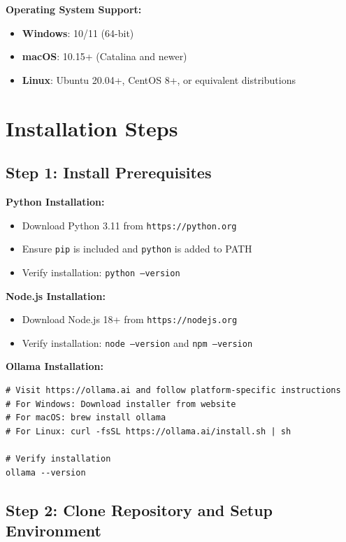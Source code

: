 \textbf{Operating System Support:}
\begin{itemize}
    \item \textbf{Windows}: 10/11 (64-bit)
    \item \textbf{macOS}: 10.15+ (Catalina and newer)
    \item \textbf{Linux}: Ubuntu 20.04+, CentOS 8+, or equivalent distributions
\end{itemize}

\section{Installation Steps}

\subsection{Step 1: Install Prerequisites}

\textbf{Python Installation:}
\begin{itemize}
    \item Download Python 3.11 from \texttt{https://python.org}
    \item Ensure \texttt{pip} is included and \texttt{python} is added to PATH
    \item Verify installation: \texttt{python --version}
\end{itemize}

\textbf{Node.js Installation:}
\begin{itemize}
    \item Download Node.js 18+ from \texttt{https://nodejs.org}
    \item Verify installation: \texttt{node --version} and \texttt{npm --version}
\end{itemize}

\textbf{Ollama Installation:}
\begin{verbatim}
# Visit https://ollama.ai and follow platform-specific instructions
# For Windows: Download installer from website
# For macOS: brew install ollama
# For Linux: curl -fsSL https://ollama.ai/install.sh | sh

# Verify installation
ollama --version
\end{verbatim}

\subsection{Step 2: Clone Repository and Setup Environment}

